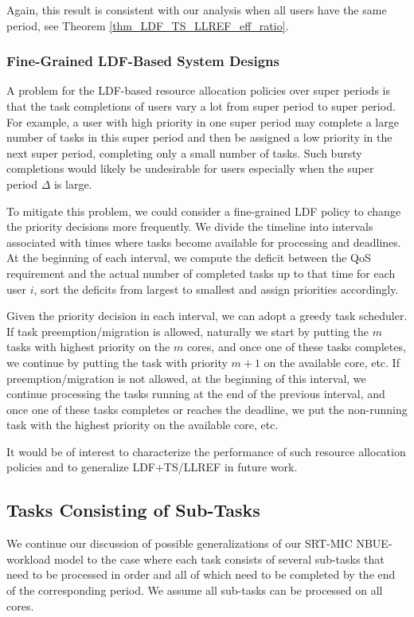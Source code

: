\documentclass[prodmode,acmtompecs]{acmsmall}
\begin{document}
Again, this result is consistent with our analysis when all users have the same period, see Theorem \ref{thm_LDF_TS_LLREF_eff_ratio}. 

\subsubsection{Fine-Grained LDF-Based System Designs}
A problem for the LDF-based resource allocation policies over super periods is that the task completions of users vary a lot from super period to super period. For example, a user with high priority in one super period may complete a large number of tasks in this super period and then be assigned a low priority in the next super period, completing only a small number of tasks. Such bursty completions would likely be undesirable for users especially when the super period $\Delta$ is large. 

To mitigate this problem, we could consider a fine-grained LDF policy to change the priority decisions more frequently. We divide the timeline into intervals associated with times where tasks become available for processing and deadlines. At the beginning of each interval, we compute the deficit between the QoS requirement and the actual number of completed tasks up to that time for each user $i$, sort the deficits from largest to smallest and assign priorities accordingly. 

Given the priority decision in each interval, we can adopt a greedy task scheduler. 
If task preemption/migration is allowed, naturally we start by putting the $m$ tasks with highest priority on the $m$ cores, and once one of these tasks completes, we continue by putting the task with priority $m+1$ on the available core, etc. 
If preemption/migration is not allowed, at the beginning of this interval, we continue processing the tasks running at the end of the previous interval, and once one of these tasks completes or reaches the deadline, we put the non-running task with the highest priority on the available core, etc. 


It would be of interest to characterize the performance of such resource allocation policies and to generalize LDF+TS/LLREF in future work. 

\subsection{Tasks Consisting of Sub-Tasks}
We continue our discussion of possible generalizations of our SRT-MIC NBUE-workload model to the case where each task consists of several sub-tasks that need to be processed in order and all of which need to be completed by the end of the corresponding period. We assume all sub-tasks can be processed on all cores. 
\end{document}
